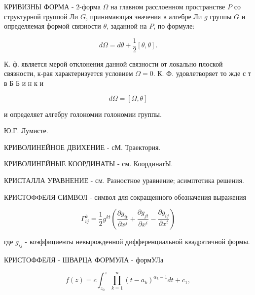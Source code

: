 \documentclass[10pt]{article}
\begin{document}
КРИВИЗНЫ ФОРМА - 2-форма $\Omega$ на главном расслоенном пространстве $P$ со структурной группой Ли $G$, принимающая значения в алгебре Ли $g$ группы $G$ и определяемая формой связности $\theta$, заданной на $P$, по формуле:



\[

d \Omega=d \theta+\frac{1}{2}[\theta, \theta] .

\]



К. ф. является мерой отклонения данной связности от локально плоской связности, к-рая характеризуется условием $\Omega=0$. К. Ф. удовлетворяет то жде с т в Б Б и н к и



\[

d \Omega=[\Omega, \theta]

\]



и определяет алгебру голономии голономии группы.



Ю.Г. Лумисте.



КРИВОЛИНЕЙНОЕ ДВИХЕНИЕ - сМ. Траектория.



КРИВОЛИНЕЙНЫЕ КООРДИНАТЫ - см. КоординатЫ.



КРИСТАЛЛА УРАВНЕНИЕ - см. Разностное уравнение; асимптотика решения.



КРИСТОФФЕЛЯ СИМВОЛ - символ для сокращенного обозначения выражения



\[

\Gamma_{i j}^{k}=\frac{1}{2} g^{k t}\left(\frac{\partial g_{i t}}{\partial x^{j}}+\frac{\partial g_{j t}}{\partial x^{i}}-\frac{\partial g_{i j}}{\partial x^{t}}\right)

\]



где $g_{i j}$ - коэффициенты невырожденной дифференциальной квадратичной формы.



КРИСТОФФЕЛЯ - ШВАРЦА ФОРМУЛА - формУЛа



\[

f(z)=c \int_{z_{0}}^{z} \prod_{k=1}^{n}\left(t-a_{k}\right)^{\alpha_{k}-1} d t+c_{1},

\]
\end{document}
